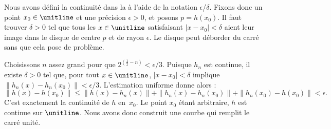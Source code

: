 \documentclass[../../../include/open-logic-section]{subfiles}
\begin{document}
Nous avons défini la continuité dans la  à l'aide
de la notation $\epsilon$/$\delta$. Fixons donc un point
$x_0\in\unitline$ et une précision $\epsilon>0$, et posons
$p=h(x_0)$. Il faut trouver $\delta>0$ tel que tous les
$x\in\unitline$ satisfaisant $|x-x_0|<\delta$ aient leur image
dans le disque de centre $p$ et de rayon $\epsilon$. Le disque
peut déborder du carré sans que cela pose de problème.

Choisissons $n$ assez grand pour que
$2^{(\frac{1}{2}-n)}<\epsilon/3$. Puisque $h_n$ est continue,
il existe $\delta>0$ tel que, pour tout $x\in\unitline$,
$|x-x_0|<\delta$ implique
$\|h_n(x)-h_n(x_0)\|<\epsilon/3$. L'estimation uniforme donne
alors :
\[
\|h(x)-h(x_0)\|
\leq \|h(x)-h_n(x)\|
+\|h_n(x)-h_n(x_0)\|
+\|h_n(x_0)-h(x_0)\|
<\epsilon.
\]
C'est exactement la continuité de $h$ en~$x_0$. Le point
$x_0$ étant arbitraire, $h$ est continue sur $\unitline$.
Nous avons donc construit une courbe qui remplit le carré unité.
\end{document}
